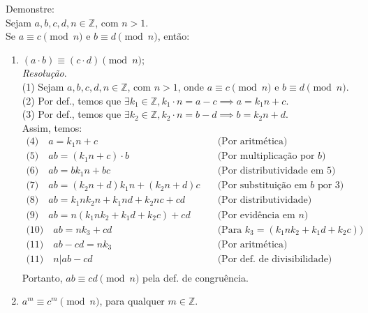 Demonstre: \\
Sejam $a, b, c, d, n \in \mathbb{Z}$, com $n > 1$. \\
Se $a\equiv c \pmod{n}$ e $b\equiv d \pmod{n}$, então:
\begin{enumerate}
	\item $(a \cdot b)\equiv (c \cdot d) \pmod{n}$; \\
	\emph{Resolução}. \\
	(1) Sejam $a, b, c, d, n \in \mathbb{Z}$, com $n > 1$, onde $a\equiv c \pmod{n}$ e $b\equiv d \pmod{n}$. \\
	(2) Por def., temos que $\exists k_1 \in \mathbb{Z}, k_1 \cdot n = a - c \implies a = k_1n + c$. \\
	(3) Por def., temos que $\exists k_2 \in \mathbb{Z}, k_2 \cdot n = b - d \implies b = k_2n + d$. \\
	Assim, temos:
	\begin{align*}
		\text{(4)} \quad a = k_1n + c &\quad \text{(Por aritmética)} \\
		\text{(5)} \quad ab = (k_1n + c) \cdot b &\quad \text{(Por multiplicação por $b$)} \\
		\text{(6)} \quad ab = bk_1n + bc &\quad \text{(Por distributividade em 5)} \\
		\text{(7)} \quad ab = (k_2n + d)k_1n + (k_2n + d)c &\quad \text{(Por substituição em $b$ por 3)} \\
		\text{(8)} \quad ab = k_1nk_2n + k_1nd + k_2nc + cd &\quad \text{(Por distributividade)} \\
		\text{(9)} \quad ab = n (k_1nk_2 + k_1d + k_2c) + cd &\quad \text{(Por evidência em $n$)} \\
		\text{(10)} \quad ab = nk_3 + cd &\quad \text{(Para $k_3 = (k_1nk_2 + k_1d + k_2c)$)} \\
		\text{(11)} \quad ab - cd = nk_3 &\quad \text{(Por aritmética)} \\
		\text{(11)} \quad n | ab - cd &\quad \text{(Por def. de divisibilidade)} \\
	\end{align*}
	Portanto, $ab \equiv cd \pmod{n}$ pela def. de congruência.
	\item $a^m \equiv c^m \pmod{n}$, para qualquer $m \in \mathbb{Z}$.
\end{enumerate}


